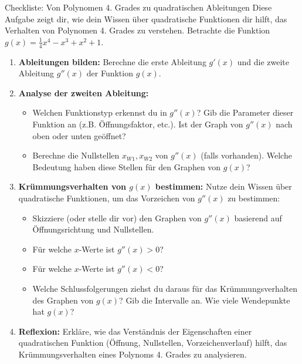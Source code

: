 \begin{aufgabenumgebung}{Checkliste: Von Polynomen 4. Grades zu quadratischen Ableitungen}
Diese Aufgabe zeigt dir, wie dein Wissen über quadratische Funktionen dir hilft, das Verhalten von Polynomen 4. Grades zu verstehen.
Betrachte die Funktion $g(x) = \frac{1}{4}x^4 - x^3 + x^2 + 1$.

\begin{enumerate}[label=(\alph*)]
    \item \textbf{Ableitungen bilden:} Berechne die erste Ableitung $g'(x)$ und die zweite Ableitung $g''(x)$ der Funktion $g(x)$.
    \item \textbf{Analyse der zweiten Ableitung:}
    \begin{itemize}
        \item Welchen Funktionstyp erkennst du in $g''(x)$? Gib die Parameter dieser Funktion an (z.B. Öffnungsfaktor, etc.). Ist der Graph von $g''(x)$ nach oben oder unten geöffnet?
        \item Berechne die Nullstellen $x_{W1}, x_{W2}$ von $g''(x)$ (falls vorhanden). Welche Bedeutung haben diese Stellen für den Graphen von $g(x)$?
    \end{itemize}
    \item \textbf{Krümmungsverhalten von $g(x)$ bestimmen:}
    Nutze dein Wissen über quadratische Funktionen, um das Vorzeichen von $g''(x)$ zu bestimmen:
    \begin{itemize}
        \item Skizziere (oder stelle dir vor) den Graphen von $g''(x)$ basierend auf Öffnungsrichtung und Nullstellen.
        \item Für welche $x$-Werte ist $g''(x) > 0$?
        \item Für welche $x$-Werte ist $g''(x) < 0$?
        \item Welche Schlussfolgerungen ziehst du daraus für das Krümmungsverhalten des Graphen von $g(x)$? Gib die Intervalle an. Wie viele Wendepunkte hat $g(x)$?
    \end{itemize}
    \item \textbf{Reflexion:} Erkläre, wie das Verständnis der Eigenschaften einer quadratischen Funktion (Öffnung, Nullstellen, Vorzeichenverlauf) hilft, das Krümmungsverhalten eines Polynoms 4. Grades zu analysieren.
\end{enumerate}
\end{aufgabenumgebung}


